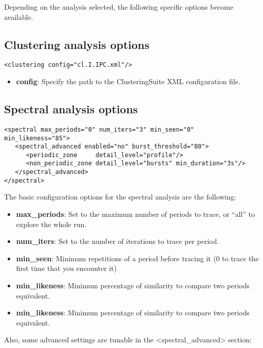  Depending on the analysis selected, the following specific options become available.

\subsection{Clustering analysis options}

\begin{verbatim}
<clustering config="cl.I.IPC.xml"/>
\end{verbatim}

\begin{itemize}
 \item \textbf{config}: Specify the path to the ClusteringSuite XML configuration file.
\end{itemize}

\subsection{Spectral analysis options}

\begin{verbatim}
<spectral max_periods="0" num_iters="3" min_seen="0" min_likeness="85">
   <spectral_advanced enabled="no" burst_threshold="80">
      <periodic_zone     detail_level="profile"/>                 
      <non_periodic_zone detail_level="bursts" min_duration="3s"/> 
   </spectral_advanced>
</spectral>
\end{verbatim}

The basic configuration options for the spectral analysis are the following:

\begin{itemize}
 \item \textbf{max\_periods}: Set to the maximum number of periods to trace, or ``all'' to explore the whole run.
 \item \textbf{num\_iters}: Set to the number of iterations to trace per period.
 \item \textbf{min\_seen}: Minimum repetitions of a period before tracing it (0 to trace the first time that you encounter it)
 \item \textbf{min\_likeness}: Minimum percentage of similarity to compare two periods equivalent.
 \item \textbf{min\_likeness}: Minimum percentage of similarity to compare two periods equivalent.
\end{itemize}

Also, some advanced settings are tunable in the <spectral\_advanced> section:

